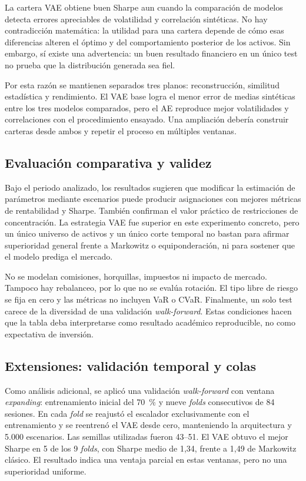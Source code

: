 La cartera VAE obtiene buen Sharpe aun cuando la comparación de modelos detecta errores apreciables de volatilidad y correlación sintéticas. No hay contradicción matemática: la utilidad para una cartera depende de cómo esas diferencias alteren el óptimo y del comportamiento posterior de los activos. Sin embargo, sí existe una advertencia: un buen resultado financiero en un único test no prueba que la distribución generada sea fiel.

Por esta razón se mantienen separados tres planos: reconstrucción, similitud estadística y rendimiento. El VAE base logra el menor error de medias sintéticas entre los tres modelos comparados, pero el AE reproduce mejor volatilidades y correlaciones con el procedimiento ensayado. Una ampliación debería construir carteras desde ambos y repetir el proceso en múltiples ventanas.

\subsection{Evaluación comparativa y validez}

Bajo el periodo analizado, los resultados sugieren que modificar la estimación de parámetros mediante escenarios puede producir asignaciones con mejores métricas de rentabilidad y Sharpe. También confirman el valor práctico de restricciones de concentración. La estrategia VAE fue superior en este experimento concreto, pero un único universo de activos y un único corte temporal no bastan para afirmar superioridad general frente a Markowitz o equiponderación, ni para sostener que el modelo prediga el mercado.

No se modelan comisiones, horquillas, impuestos ni impacto de mercado. Tampoco hay rebalanceo, por lo que no se evalúa rotación. El tipo libre de riesgo se fija en cero y las métricas no incluyen VaR o CVaR. Finalmente, un solo test carece de la diversidad de una validación \textit{walk-forward}. Estas condiciones hacen que la tabla deba interpretarse como resultado académico reproducible, no como expectativa de inversión.

\subsection{Extensiones: validación temporal y colas}

Como análisis adicional, se aplicó una validación \textit{walk-forward} con ventana \textit{expanding}: entrenamiento inicial del 70~\% y nueve \textit{folds} consecutivos de 84 sesiones. En cada \textit{fold} se reajustó el escalador exclusivamente con el entrenamiento y se reentrenó el VAE desde cero, manteniendo la arquitectura y 5.000 escenarios. Las semillas utilizadas fueron 43--51. El VAE obtuvo el mejor Sharpe en 5 de los 9 \textit{folds}, con Sharpe medio de 1,34, frente a 1,49 de Markowitz clásico. El resultado indica una ventaja parcial en estas ventanas, pero no una superioridad uniforme.

